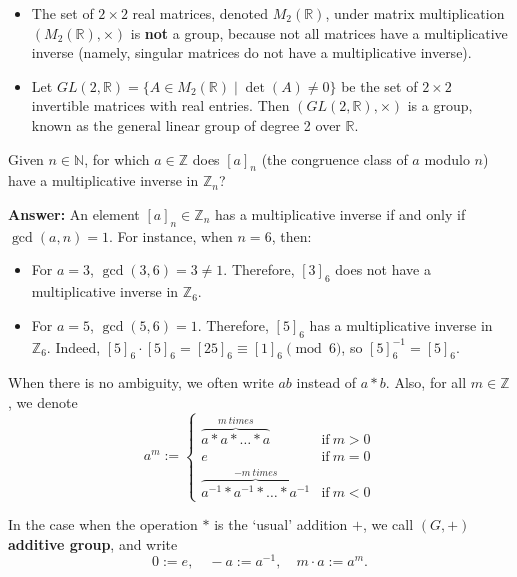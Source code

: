 \begin{example}
\begin{itemize}
\item[(h)] The set of $2 \times 2$ real matrices, denoted $M_2(\mathbb{R})$, under matrix multiplication $(M_2(\mathbb{R}), \times)$ is \textbf{not} a group, because not all matrices have a multiplicative inverse (namely, singular matrices do not have a multiplicative inverse).
\item[(i)] Let $GL(2, \mathbb{R}) = \{ A \in M_2(\mathbb{R}) \mid \det(A) \neq 0 \}$ be the set of $2 \times 2$ invertible matrices with real entries. Then $(GL(2, \mathbb{R}), \times)$ is a group, known as the general linear group of degree 2 over $\mathbb{R}$.
\end{itemize}
\end{example}

\begin{question}
Given $n \in \mathbb{N}$, for which $a \in \mathbb{Z}$ does $[a]_n$ (the congruence class of $a$ modulo $n$) have a multiplicative inverse in $\mathbb{Z}_n$?
\end{question}

\noindent\textbf{Answer:} 
An element $[a]_n \in \mathbb{Z}_n$ has a multiplicative inverse if and only if $\gcd(a, n) = 1$. 
For instance, when $n=6$, then:
\begin{itemize}
    \item For $a=3$, $\gcd(3, 6) = 3 \neq 1$. Therefore, $[3]_6$ does not have a multiplicative inverse in $\mathbb{Z}_6$.
    \item For $a=5$, $\gcd(5, 6) = 1$. Therefore, $[5]_6$ has a multiplicative inverse in $\mathbb{Z}_6$. Indeed, $[5]_6 \cdot [5]_6 = [25]_6 \equiv [1]_6 \pmod{6}$, so $[5]_6^{-1} = [5]_6$.
\end{itemize}

\begin{remark}
When there is no ambiguity, we often write $ab$ instead of $a \ast b$. Also, for all $m \in \mathbb{Z}$, we denote
    $$a^m := \begin{cases}
        \overbrace{a \ast a \ast \dots \ast a}^{m\ times} &\text{if}\ m > 0 \\
        e &\text{if}\ m = 0 \\
        \overbrace{a^{-1} \ast a^{-1} \ast \dots \ast a^{-1}}^{-m\ times} &\text{if}\ m < 0
    \end{cases}$$

In the case when the operation $\ast$ is the `usual' addition $+$, we call $(G,+)$ {\bf additive group}, and write
$$0 := e, \quad -a := a^{-1}, \quad m \cdot a := a^m.$$
\end{remark}


